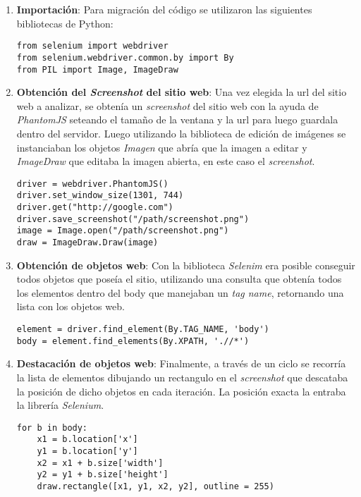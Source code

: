 	\newpage
		\begin{enumerate}
			\item \textbf{Importación}: Para migración del código se utilizaron las siguientes
			bibliotecas de Python:
			\begin{lstlisting}[style=Python, caption={Bibliotecas utilizadas para el mapa de objetos.}]
from selenium import webdriver
from selenium.webdriver.common.by import By
from PIL import Image, ImageDraw
\end{lstlisting}
			\item \textbf{Obtención  del \textit{Screenshot} del sitio web}: Una vez elegida la
			url del sitio web a analizar, se obtenía un \textit{screenshot} del sitio web con 
			la ayuda de \textit{PhantomJS} seteando el tamaño de la ventana y la url para luego
			guardala dentro del servidor. Luego utilizando la biblioteca de edición de imágenes
			se instanciaban los objetos \textit{Imagen} que abría que la imagen a editar y 
			\textit{ImageDraw} que editaba la imagen abierta, en este caso el \textit{screenshot}.
			\begin{lstlisting}[style=Python, caption={Destacación de objetos web}]
driver = webdriver.PhantomJS()
driver.set_window_size(1301, 744)
driver.get("http://google.com")
driver.save_screenshot("/path/screenshot.png")
image = Image.open("/path/screenshot.png")
draw = ImageDraw.Draw(image)
\end{lstlisting}
			\item \textbf{Obtención de objetos web}: Con la biblioteca \textit{Selenim} era
			posible conseguir todos objetos que poseía el sitio, utilizando una consulta que
			obtenía todos los elementos dentro del body que manejaban un \textit{tag name},
			retornando una lista con los objetos web.
\begin{lstlisting}[style=Python, caption={Consulta al body del sitio web.}]
element = driver.find_element(By.TAG_NAME, 'body')
body = element.find_elements(By.XPATH, './/*')
\end{lstlisting}
		\item \textbf{Destacación de objetos web}: Finalmente, a través de un ciclo se recorría
		la lista de elementos dibujando un rectangulo en el \textit{screenshot} que descataba la 
		posición de dicho objetos en cada iteración. La posición exacta la entraba la librería 
		\textit{Selenium}.
\begin{lstlisting}[style=Python, caption={Algoritmo mapa de objetos de simplificado
versión \textit{Python}.}]
for b in body:
	x1 = b.location['x']
	y1 = b.location['y']
	x2 = x1 + b.size['width']
	y2 = y1 + b.size['height']
	draw.rectangle([x1, y1, x2, y2], outline = 255)
\end{lstlisting}
		\end{enumerate}				
		
